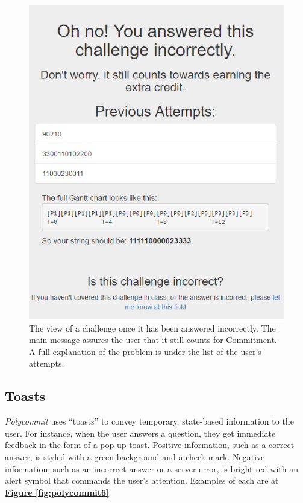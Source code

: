 \begin{figure}
	\includegraphics{figures/pc-incorrect}
	\caption{The view of a challenge once it has been answered incorrectly. The main message assures the user that it still counts for Commitment. A full explanation of the problem is under the list of the user's attempts.}
	\label{fig:polycommit5}
\end{figure}

\subsection{Toasts}
\par \textit{Polycommit} uses ``toasts'' to convey temporary, state-based information to the user. For instance, when the user answers a question, they get immediate feedback in the form of a pop-up toast. Positive information, such as a correct answer, is styled with a green background and a check mark. Negative information, such as an incorrect answer or a server error, is bright red with an alert symbol that commands the user's attention. Examples of each are at \textbf{\hyperref[fig:polycommit6]{Figure \ref*{fig:polycommit6}}}.


